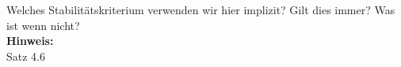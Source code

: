 \begin{question}[section=5,name={Stabilitätskriterium},difficulty=,type=mdl,tags={}]
	Welches Stabilitätskriterium verwenden wir hier implizit? Gilt dies immer? Was ist wenn nicht?
	\\ \textbf{Hinweis:}\\
	Satz 4.6
\end{question}
\begin{solution}
	
\end{solution}